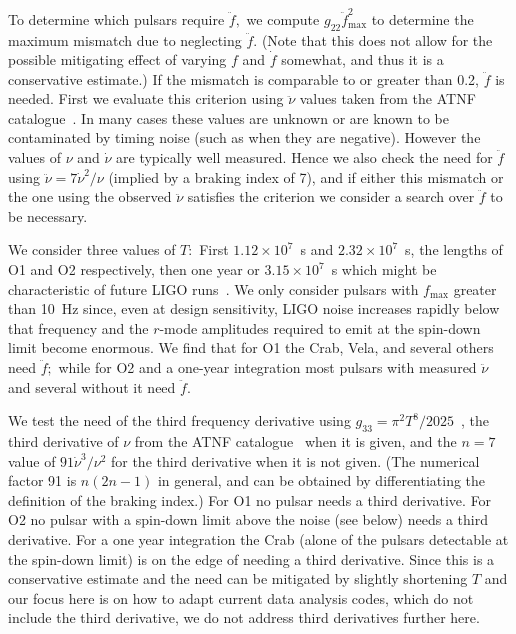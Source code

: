 \documentclass{ttuthes2007}
\begin{document}
To determine which pulsars require $\ddot f,$ we compute $g_{22} \ddot
f_{\max}^2$ to determine the maximum mismatch due to neglecting $\ddot f.$
(Note that this does not allow for the possible mitigating effect of varying
$f$ and $\dot f$ somewhat, and thus it is a conservative estimate.)
If the mismatch is comparable to or greater than 0.2, $\ddot f$ is needed.
First we evaluate this criterion using $\ddot\nu$ values taken from the ATNF
catalogue~\cite{Manchester:2004bp}.
In many cases these values are unknown or are known to be contaminated by
timing noise (such as when they are negative).
However the values of $\nu$ and $\dot\nu$ are typically well measured.
Hence we also check the need for $\ddot f$ using $\ddot\nu = 7 \dot\nu^2 /
\nu$ (implied by a braking index of 7), and if either this mismatch or the one
using the observed $\ddot\nu$ satisfies the criterion we consider a search
over $\ddot f$ to be necessary.

We consider three values of $T:$
First $1.12\times10^7$~s and $2.32\times10^7$~s, the lengths of \ac{O1} and
\ac{O2} respectively, then one year or $3.15\times10^7$~s which might be
characteristic of future LIGO runs~\cite{Aasi:2013wya}.
We only consider pulsars with $f_{\max}$ greater than 10~Hz since, even at
design sensitivity, LIGO noise increases rapidly below that frequency and the
$r$-mode amplitudes required to emit at the spin-down limit become enormous.
We find that for \ac{O1} the Crab, Vela, and several others need $\ddot f;$
while for \ac{O2} and a one-year integration most pulsars with measured
$\ddot\nu$ and several without it need $\ddot f.$

We test the need of the third frequency derivative using $g_{33} = \pi^2 T^8 /
2025$~\cite{Wette:2008hg}, the third derivative of $\nu$ from the ATNF
catalogue~\cite{Manchester:2004bp} when it is given, and the $n=7$ value of
$91 \dot\nu^3 / \nu^2$ for the third derivative when it is not given.
(The numerical factor 91 is $n(2n-1)$ in general, and can be obtained by
differentiating the definition of the braking index.)
For \ac{O1} no pulsar needs a third derivative.
For \ac{O2} no pulsar with a spin-down limit above the noise (see below) needs
a third derivative.
For a one year integration the Crab (alone of the pulsars detectable at the
spin-down limit) is on the edge of needing a third derivative.
Since this is a conservative estimate and the need can be mitigated by
slightly shortening $T$ and our focus here is on how to adapt current data
analysis codes, which do not include the third derivative, we do not address
third derivatives further here.
\end{document}

